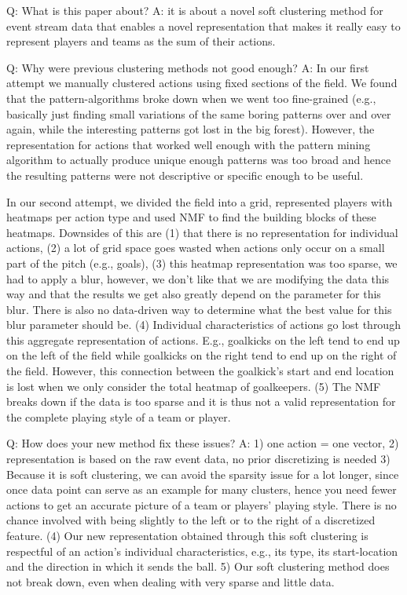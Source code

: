 \documentclass[runningheads]{llncs}
\begin{document}




Q: What is this paper about?
A: it is about a novel soft clustering method for event stream data that enables a novel representation that makes it really easy to represent players and teams as the sum of their actions.

Q: Why were previous clustering methods not good enough?
A: In our first attempt we manually clustered actions using fixed sections of the field. We found that the pattern-algorithms broke down when we went too fine-grained (e.g., basically just finding small variations of the same boring patterns over and over again, while the interesting patterns got lost in the big forest). However, the representation for actions that worked well enough with the pattern mining algorithm to actually produce unique enough patterns was too broad and hence the resulting patterns were not descriptive or specific enough to be useful.

In our second attempt, we divided the field into a grid, represented players with heatmaps per action type and used NMF to find the building blocks of these heatmaps. Downsides of this are (1) that there is no representation for individual actions, (2) a lot of grid space goes wasted when actions only occur on a small part of the pitch (e.g., goals), (3) this heatmap representation was too sparse, we had to apply a blur, however, we don't like that we are modifying the data this way and that the results we get also greatly depend on the parameter for this blur. There is also no data-driven way to determine what the best value for this blur parameter should be. (4) Individual characteristics of actions go lost through this aggregate representation of actions. E.g., goalkicks on the left tend to end up on the left of the field while goalkicks on the right tend to end up on the right of the field. However, this connection between the goalkick's start and end location is lost when we only consider the total heatmap of goalkeepers. (5) The NMF breaks down if the data is too sparse and it is thus not a valid representation for the complete playing style of a team or player.

Q: How does your new method fix these issues?
A: 1) one action = one vector, 2) representation is based on the raw event data, no prior discretizing is needed 3) Because it is soft clustering, we can avoid the sparsity issue for a lot longer, since once data point can serve as an example for many clusters, hence you need fewer actions to get an accurate picture of a team or players' playing style. There is no chance involved with being slightly to the left or to the right of a discretized feature. (4) Our new representation obtained through this soft clustering is respectful of an action's individual characteristics, e.g., its type, its start-location and the direction in which it sends the ball. 5) Our soft clustering method does not break down, even when dealing with very sparse and little data.
\end{document}
